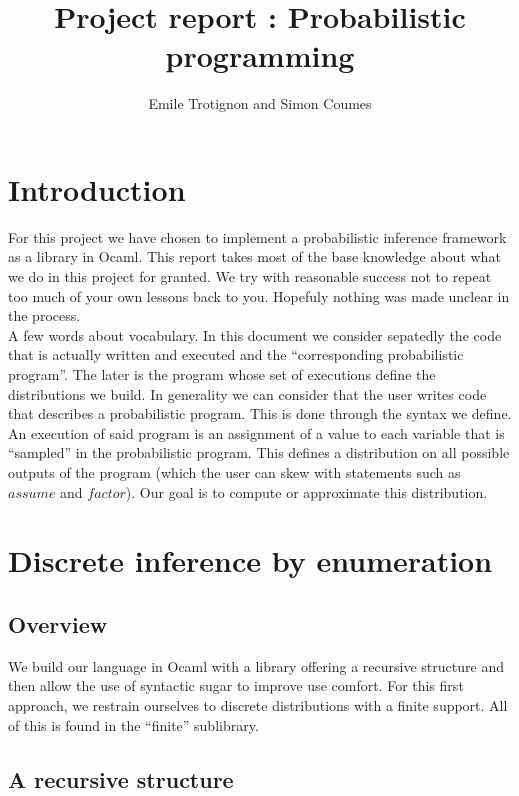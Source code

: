 \documentclass{article}
\title{Project report : Probabilistic programming}
\author{Emile Trotignon and Simon Coumes}
\begin{document}
\maketitle

\section{Introduction}

	For this project we have chosen to implement a probabilistic inference framework as a library in Ocaml.
	This report takes most of the base knowledge about what we do in this project for granted.
	We try with reasonable success not to repeat too much of your own lessons back to you. 
	Hopefuly nothing was made unclear in the process. \\

	A few words about vocabulary.
	In this document we consider sepatedly the code that is actually written and executed and the ``corresponding probabilistic program''.
	The later is the program whose set of executions define the distributions we build.
	In generality we can consider that the user writes code that describes a probabilistic program. 
	This is done through the syntax we define.
	An execution of said program is an assignment of a value to each variable that is ``sampled'' in the probabilistic program. 
	This defines a distribution on all possible outputs of the program (which the user can skew with statements such as $assume$ and $factor$). Our goal is to compute or approximate this distribution. 



\section{Discrete inference by enumeration}

	\subsection{Overview}

	We build our language in Ocaml with a library offering a recursive structure and then allow the use of syntactic sugar to improve use comfort.
	For this first approach, we restrain ourselves to discrete distributions with a finite support. 
	All of this is found in the ``finite'' sublibrary. \\

	\subsection{A recursive structure}
\end{document}
